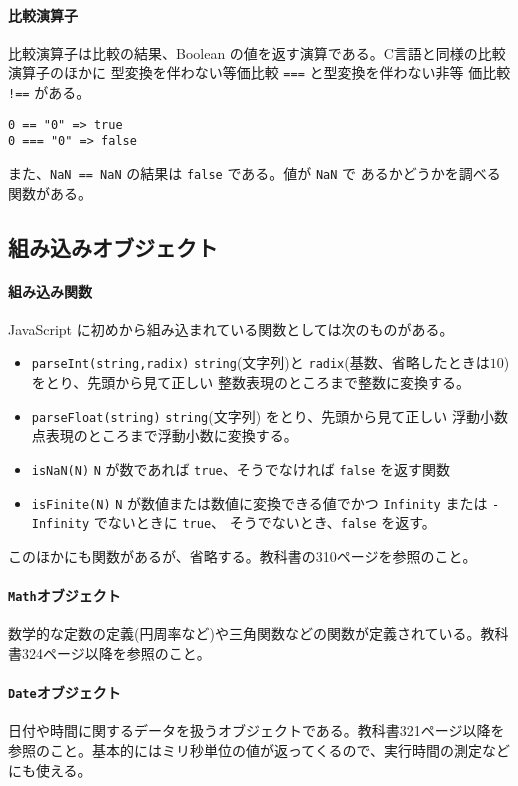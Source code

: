 \documentclass[a4j]{jarticle}
\begin{document}
\paragraph{比較演算子}
比較演算子は比較の結果、Boolean の値を返す演算である。C言語と同様の比較
演算子のほかに 型変換を伴わない等価比較 \verb+===+ と型変換を伴わない非等
価比較 \verb+!==+ がある。
\begin{Verbatim}
0 == "0" => true
0 === "0" => false
\end{Verbatim}
また、\verb+NaN == NaN+ の結果は \verb+false+ である。値が \verb+NaN+ で
あるかどうかを調べる関数がある。
\subsection{組み込みオブジェクト}
\paragraph{組み込み関数}
JavaScript に初めから組み込まれている関数としては次のものがある。
\begin{itemize}
 \item \verb+parseInt(string,radix)+ \verb+string+(文字列)と
       \verb+radix+(基数、省略したときは$10$)をとり、先頭から見て正しい
       整数表現のところまで整数に変換する。
 \item \verb+parseFloat(string)+ \verb+string+(文字列)
       をとり、先頭から見て正しい
       浮動小数点表現のところまで浮動小数に変換する。
 \item \verb+isNaN(N)+ \verb+N+ が数であれば \verb+true+、そうでなければ
       \verb+false+ を返す関数
 \item \verb+isFinite(N)+ \verb+N+ が数値または数値に変換できる値でかつ
       \verb+Infinity+ または \verb+-Infinity+ でないときに \verb+true+、
       そうでないとき、\verb+false+ を返す。
\end{itemize}
このほかにも関数があるが、省略する。教科書の310ページを参照のこと。
\paragraph{\protect\texttt{Math}オブジェクト}
数学的な定数の定義(円周率など)や三角関数などの関数が定義されている。教科
書324ページ以降を参照のこと。
\paragraph{\protect\texttt{Date}オブジェクト}
日付や時間に関するデータを扱うオブジェクトである。教科書321ページ以降を
参照のこと。基本的にはミリ秒単位の値が返ってくるので、実行時間の測定など
にも使える。
\newpage
\end{document}
